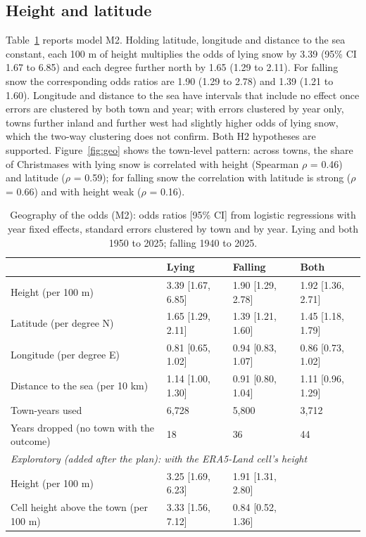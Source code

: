 \documentclass[11pt,a4paper]{article}
\begin{document}
\subsection{Height and latitude}
Table~\ref{tab:geo} reports model M2. Holding latitude, longitude and distance to the sea constant, each 100 m of height multiplies the odds of lying snow by 3.39 (95\% CI 1.67 to 6.85) and each degree further north by 1.65 (1.29 to 2.11). For falling snow the corresponding odds ratios are 1.90 (1.29 to 2.78) and 1.39 (1.21 to 1.60). Longitude and distance to the sea have intervals that include no effect once errors are clustered by both town and year; with errors clustered by year only, towns further inland and further west had slightly higher odds of lying snow, which the two-way clustering does not confirm. Both H2 hypotheses are supported. Figure~\ref{fig:geo} shows the town-level pattern: across towns, the share of Christmases with lying snow is correlated with height (Spearman $\rho$ = 0.46) and latitude ($\rho$ = 0.59); for falling snow the correlation with latitude is strong ($\rho$ = 0.66) and with height weak ($\rho$ = 0.16).

\begin{table}[tbp]\centering\small\caption{Geography of the odds (M2): odds ratios [95\% CI] from logistic regressions with year fixed effects, standard errors clustered by town and by year. Lying and both 1950 to 2025; falling 1940 to 2025.}\label{tab:geo}\begin{tabular}{llll}\toprule & Lying & Falling & Both\\\midrule
Height (per 100 m) & 3.39 [1.67, 6.85] & 1.90 [1.29, 2.78] & 1.92 [1.36, 2.71]\\
Latitude (per degree N) & 1.65 [1.29, 2.11] & 1.39 [1.21, 1.60] & 1.45 [1.18, 1.79]\\
Longitude (per degree E) & 0.81 [0.65, 1.02] & 0.94 [0.83, 1.07] & 0.86 [0.73, 1.02]\\
Distance to the sea (per 10 km) & 1.14 [1.00, 1.30] & 0.91 [0.80, 1.04] & 1.11 [0.96, 1.29]\\
\midrule Town-years used & 6,728 & 5,800 & 3,712\\
Years dropped (no town with the outcome) & 18 & 36 & 44\\
\midrule\multicolumn{4}{l}{\textit{Exploratory (added after the plan): with the ERA5-Land cell's height}}\\
Height (per 100 m) & 3.25 [1.69, 6.23] & 1.91 [1.31, 2.80] & \\
Cell height above the town (per 100 m) & 3.33 [1.56, 7.12] & 0.84 [0.52, 1.36] & \\
\bottomrule\end{tabular}\end{table}
\end{document}
